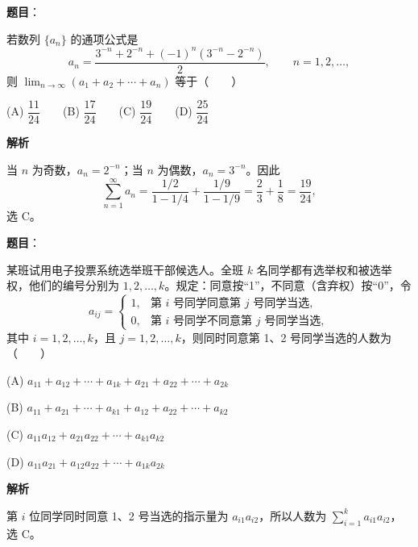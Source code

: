 \begin{answer}

\textbf{题目}：

若数列 \(\{a_n\}\) 的通项公式是
\nopagebreak[4]
\[
   a_n=\frac{3^{-n}+2^{-n}+(-1)^n(3^{-n}-2^{-n})}{2},\qquad n=1,2,\ldots,
\]
   则 \(\displaystyle\lim_{n\to\infty}(a_1+a_2+\cdots+a_n)\) 等于\mbox{（　　）}

   (A) \(\dfrac{11}{24}\)　　(B) \(\dfrac{17}{24}\)　　(C) \(\dfrac{19}{24}\)　　(D) \(\dfrac{25}{24}\)

\textbf{解析}

当 \(n\) 为奇数，\(a_n=2^{-n}\)；当 \(n\) 为偶数，\(a_n=3^{-n}\)。因此
\nopagebreak[4]
\[
\sum_{n=1}^{\infty}a_n=\frac{1/2}{1-1/4}+\frac{1/9}{1-1/9}=\frac23+\frac18=\frac{19}{24},
\]
选 C。


\end{answer}
\begin{answer}

\textbf{题目}：

某班试用电子投票系统选举班干部候选人。全班 \(k\) 名同学都有选举权和被选举权，他们的编号分别为 \(1,2,\ldots,k\)。规定：同意按“1”，不同意（含弃权）按“0”，令
\nopagebreak[4]
\[
    a_{ij}=\begin{cases}
    1,&\text{第 }i\text{ 号同学同意第 }j\text{ 号同学当选},\\
    0,&\text{第 }i\text{ 号同学不同意第 }j\text{ 号同学当选},
    \end{cases}
\]
    其中 \(i=1,2,\ldots,k\)，且 \(j=1,2,\ldots,k\)，则同时同意第 1、2 号同学当选的人数为\mbox{（　　）}

    (A) \(a_{11}+a_{12}+\cdots+a_{1k}+a_{21}+a_{22}+\cdots+a_{2k}\)

    (B) \(a_{11}+a_{21}+\cdots+a_{k1}+a_{12}+a_{22}+\cdots+a_{k2}\)

    (C) \(a_{11}a_{12}+a_{21}a_{22}+\cdots+a_{k1}a_{k2}\)

    (D) \(a_{11}a_{21}+a_{12}a_{22}+\cdots+a_{1k}a_{2k}\)

\textbf{解析}

第 \(i\) 位同学同时同意 1、2 号当选的指示量为 \(a_{i1}a_{i2}\)，所以人数为 \(\sum_{i=1}^k a_{i1}a_{i2}\)，选 C。


\end{answer}

